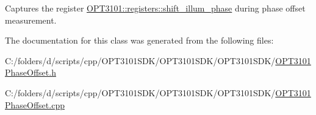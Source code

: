 Captures the register \mbox{\hyperlink{class_o_p_t3101_1_1registers_a18539cc6fd63ce4f504fcf16b1e48f31}{O\+P\+T3101\+::registers\+::shift\+\_\+illum\+\_\+phase}} during phase offset measurement. 



The documentation for this class was generated from the following files\+:\begin{DoxyCompactItemize}
\item 
C\+:/folders/d/scripts/cpp/\+O\+P\+T3101\+S\+D\+K/\+O\+P\+T3101\+S\+D\+K/\+O\+P\+T3101\+S\+D\+K/\mbox{\hyperlink{_o_p_t3101_phase_offset_8h}{O\+P\+T3101\+Phase\+Offset.\+h}}\item 
C\+:/folders/d/scripts/cpp/\+O\+P\+T3101\+S\+D\+K/\+O\+P\+T3101\+S\+D\+K/\+O\+P\+T3101\+S\+D\+K/\mbox{\hyperlink{_o_p_t3101_phase_offset_8cpp}{O\+P\+T3101\+Phase\+Offset.\+cpp}}\end{DoxyCompactItemize}
